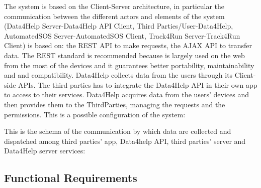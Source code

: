 \documentclass[a4paper]{article}
\begin{document}
    The system is based on the Client-Server architecture, in particular the communication between the different actors and elements of the system (Data4Help Server-Data4Help API Client, Third Parties/User-Data4Help, AutomatedSOS Server-AutomatedSOS Client, Track4Run Server-Track4Run Client) is based on: the REST API to make requests, the AJAX API to transfer data. The REST standard is recommended because is largely used on the web from the most of the devices and it guarantees better portability, maintainability and and compatibility.
    Data4Help collects data from the users through its Client-side APIs. The third parties has to integrate the Data4Help API in their own app to access to their services. Data4Help acquires data from the users' devices and then provides them to the ThirdParties, managing the requests and the permissions. 
    This is a possible configuration of the system:
    
    This is the schema of the communication by which data are collected and dispatched among third parties' app, Data4help API, third parties' server and Data4Help server services:
   
    \subsection{Functional Requirements}
    
\end{document}
